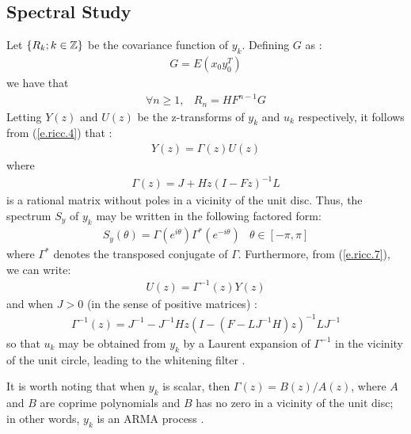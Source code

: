 \subsection{Spectral Study}
Let $\{R_k; k\in {\Bbb Z}\}$ be the covariance function of $y_k$.
Defining $G$ as : 
\begin{eqnarray}
G=E(x_0 y_0^T) \label{e.ricc.5}
\end{eqnarray}
we have that 
\begin{eqnarray}
\forall n \geq 1, &  R_n=HF^{n-1}G \label{e.ricc.6}
\end{eqnarray}
Letting $Y(z)$ and $U(z)$ be the z-transforms of $y_k$ and $u_k$ respectively, 
it follows from (\ref{e.ricc.4}) that : 
\begin{eqnarray}
Y(z)=\Gamma (z)U(z) 
\label{e.ricc.7}
\end{eqnarray}
where
\begin{eqnarray}
\Gamma (z)=J+Hz(I-Fz)^{-1}L \label{e.ricc.8}
\end{eqnarray}
is a rational matrix without poles in a vicinity of the unit disc.
Thus, the spectrum  $S_y$ of $y_k$ may be written 
in the following factored form:
\begin{eqnarray}
S_y(\theta)=\Gamma (e^{i\theta})\Gamma ^{*}(e^{-i\theta}) 
 & \theta \in [-\pi, \pi]
\label{e.ricc.9}
\end{eqnarray}
where $\Gamma ^{*}$ denotes the transposed conjugate of $\Gamma$.
Furthermore, from (\ref{e.ricc.7}), we can write:
\begin{eqnarray}
U(z)=\Gamma ^{-1}(z)Y(z)
\label{e.ricc.10}
\end{eqnarray}
and when $J>0$ (in the sense of positive matrices) :
\begin{eqnarray}
\Gamma ^{-1}(z)=J^{-1}-J^{-1}Hz(I-(F-LJ^{-1}H)z)^{-1}LJ^{-1}
\label{e.ricc.11}
\end{eqnarray}
so that $u_k$ may be obtained from $y_k$ by a Laurent expansion of 
$\Gamma ^{-1}$ in the vicinity of the unit circle, leading to the
whitening filter .

It is worth noting that when $y_k$ is scalar, then 
$\Gamma (z)=B(z)/A(z)$, where $A$ and $B$ are coprime polynomials
and $B$ has no zero in a vicinity of the unit disc; in other words, 
$y_k$ is an ARMA process .

